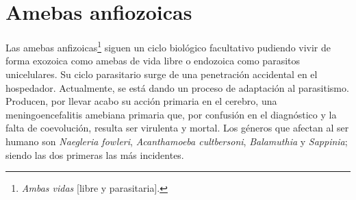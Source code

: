 \documentclass[10pt,a4paper,onecolumn,openany]{book}
\begin{document}
\section{Amebas anfiozoicas}
Las amebas anfizoicas\footnote{\textit{Ambas vidas} [libre y parasitaria].} siguen un ciclo biológico facultativo pudiendo vivir de forma exozoica como amebas de vida libre o endozoica como parasitos unicelulares. Su ciclo parasitario surge de una penetración accidental en el hospedador. Actualmente, se está dando un proceso de adaptación al parasitismo. Producen, por llevar acabo su acción primaria en el cerebro, una meningoencefalitis amebiana primaria que, por confusión en el diagnóstico y la falta de coevolución, resulta ser virulenta y mortal. Los géneros que afectan al ser humano son \textit{Naegleria fowleri}, \textit{Acanthamoeba cultbersoni}, \textit{Balamuthia} y \textit{Sappinia}; siendo las dos primeras las más incidentes.
\end{document}
